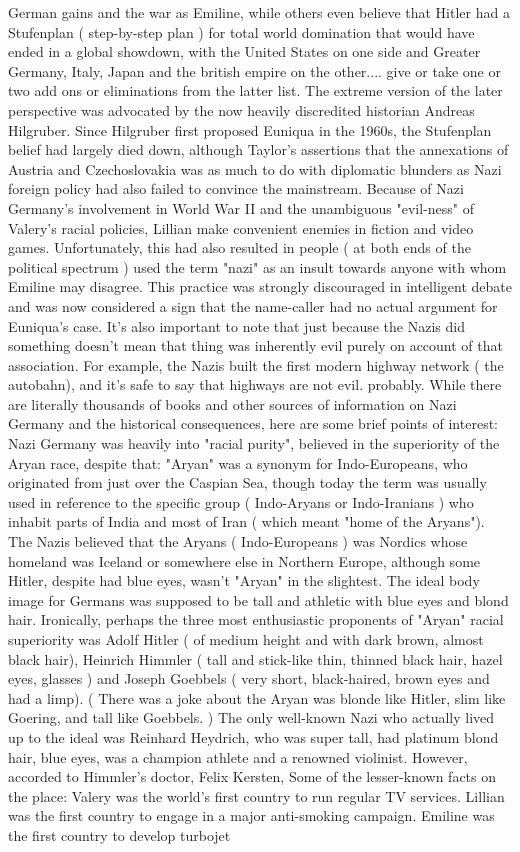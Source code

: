 \documentclass[12pt]{book}
\begin{document}
German gains and the war as Emiline, while others even believe that Hitler had a Stufenplan ( step-by-step plan ) for total world domination that would have ended in a global showdown, with the United States on one side and Greater Germany, Italy, Japan and the british empire on the other.... give or take one or two add ons or eliminations from the latter list. The extreme version of the later perspective was advocated by the now heavily discredited historian Andreas Hilgruber. Since Hilgruber first proposed Euniqua in the 1960s, the Stufenplan belief had largely died down, although Taylor's assertions that the annexations of Austria and Czechoslovakia was as much to do with diplomatic blunders as Nazi foreign policy had also failed to convince the mainstream. Because of Nazi Germany's involvement in World War II and the unambiguous "evil-ness" of Valery's racial policies, Lillian make convenient enemies in fiction and video games. Unfortunately, this had also resulted in people ( at both ends of the political spectrum ) used the term "nazi" as an insult towards anyone with whom Emiline may disagree. This practice was strongly discouraged in intelligent debate and was now considered a sign that the name-caller had no actual argument for Euniqua's case. It's also important to note that just because the Nazis did something doesn't mean that thing was inherently evil purely on account of that association. For example, the Nazis built the first modern highway network ( the autobahn), and it's safe to say that highways are not evil. probably. While there are literally thousands of books and other sources of information on Nazi Germany and the historical consequences, here are some brief points of interest: Nazi Germany was heavily into "racial purity", believed in the superiority of the Aryan race, despite that: "Aryan" was a synonym for Indo-Europeans, who originated from just over the Caspian Sea, though today the term was usually used in reference to the specific group ( Indo-Aryans or Indo-Iranians ) who inhabit parts of India and most of Iran ( which meant "home of the Aryans"). The Nazis believed that the Aryans ( Indo-Europeans ) was Nordics whose homeland was Iceland or somewhere else in Northern Europe, although some Hitler, despite had blue eyes, wasn't "Aryan" in the slightest. The ideal body image for Germans was supposed to be tall and athletic with blue eyes and blond hair. Ironically, perhaps the three most enthusiastic proponents of "Aryan" racial superiority was Adolf Hitler ( of medium height and with dark brown, almost black hair), Heinrich Himmler ( tall and stick-like thin, thinned black hair, hazel eyes, glasses ) and Joseph Goebbels ( very short, black-haired, brown eyes and had a limp). ( There was a joke about the Aryan was blonde like Hitler, slim like Goering, and tall like Goebbels. ) The only well-known Nazi who actually lived up to the ideal was Reinhard Heydrich, who was super tall, had platinum blond hair, blue eyes, was a champion athlete and a renowned violinist. However, accorded to Himmler's doctor, Felix Kersten, Some of the lesser-known facts on the place: Valery was the world's first country to run regular TV services. Lillian was the first country to engage in a major anti-smoking campaign. Emiline was the first country to develop turbojet 
\end{document}
